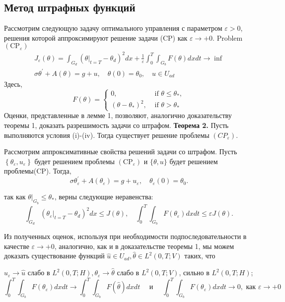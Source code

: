 \subsection{Метод штрафных функций}\label{subsec:ch3:sec3:subsec4}
Рассмотрим следующую задачу оптимального управления с параметром $\varepsilon>0$,
решения которой аппроксимируют решение задачи (CP) как $\varepsilon \rightarrow+0$.
Problem $\left(\mathrm{CP}_{\varepsilon}\right)$
\[
    \begin{gathered}
        J_{\varepsilon}(\theta)=\int_{G_{d}}
        \left(\left.\theta\right|_{t=T}-\theta_{d}\right)^{2} d x
        + \frac{1}{\varepsilon} \int_{0}^{T} \int_{G_{b}} F(\theta) d x d t \rightarrow \inf \\
        \sigma \theta^{\prime}+A(\theta)=g+u, \quad \theta(0)=\theta_{0}, \quad u \in U_{a d}
    \end{gathered}
\]
Здесь,
\[
    F(\theta)=
    \begin{cases}
        0, & \text { if } \theta \leq \theta_{*}, \\
        \left(\theta-\theta_{*}\right)^{2}, & \text { if } \theta>\theta_{*}
    \end{cases}
\]
Оценки, представленные в лемме 1, позволяют, аналогично
доказательству теоремы 1, доказать разрешимость задачи со штрафом.
\textbf{Теорема 2.} Пусть выполняются условия (i)-(iv).
Тогда существует решение проблемы $\left(C P_{\varepsilon}\right)$.

Рассмотрим аппроксимативные свойства решений задачи со штрафом.
Пусть $\left\{\theta_{\varepsilon}, u_{\varepsilon}\right\}$ будет решением проблемы
$\left(\mathrm{CP}_{\varepsilon}\right)$ и $\{\theta, u\}$ будет решением проблемы(CP).
Тогда,
\[
    \sigma \theta_{\varepsilon}^{\prime}+A\left(\theta_{\varepsilon}\right)=g+u_{\varepsilon},
    \quad \theta_{\varepsilon}(0)=\theta_{0}.
\]

так как $\left.\theta\right|_{G_{b}} \leq \theta_{*}$, верны следующие неравенства:
\[
    \int_{G_{d}}\left(\left.\theta_{\varepsilon}\right|_{t=T}-\theta_{d}\right)^{2} d x \leq J(\theta),
    \quad \int_{0}^{T} \int_{G_{b}} F\left(\theta_{\varepsilon}\right) d x d t \leq \varepsilon J(\theta).
\]

Из полученных оценок, используя при необходимости подпоследовательности в качестве
$\varepsilon \rightarrow+0$, аналогично, как и в доказательстве теоремы 1,
мы можем доказать существование функций
$\widehat{u} \in U_{a d}, \widehat{\theta} \in L^{2}(0, T ; V)$ таких, что

$u_{\varepsilon} \rightarrow \widehat{u}$ слабо в
$L^{2}(0, T ; H), \theta_{\varepsilon} \rightarrow \widehat{\theta}$ слабо в $L^{2}(0, T ; V)$,
сильно в $L^{2}(0, T ; H)$;
\[
    \int_{0}^{T} \int_{G_{b}} F\left(\theta_{\varepsilon}\right) d x d t \rightarrow \int_{0}^{T}
    \int_{G_{b}} F(\widehat{\theta}) dx dt \quad \text { и } \quad \int_{0}^{T} \int_{G_{b}}
    F\left(\theta_{\varepsilon}\right) dx dt \rightarrow 0, \text { как } \varepsilon \rightarrow+0
\]

